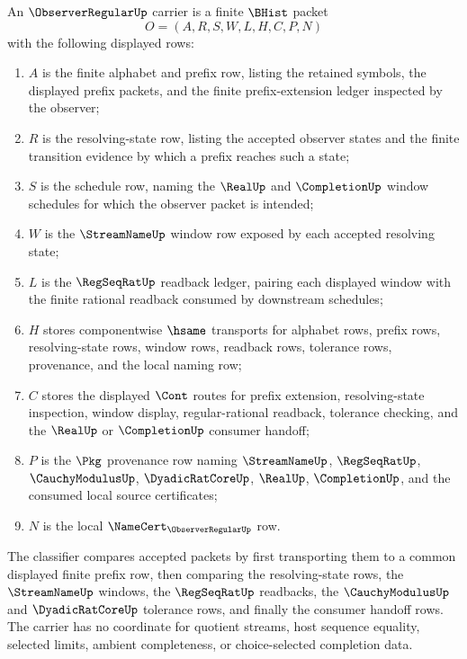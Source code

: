\begin{definition}
\label{def:observerregular-prefix-carrier}
An $\ObserverRegularUp$ carrier is a finite $\BHist$ packet
$$
O=(A,R,S,W,L,H,C,P,N)
$$
with the following displayed rows:
\begin{enumerate}
\item $A$ is the finite alphabet and prefix row, listing the retained symbols, the displayed prefix packets, and the finite prefix-extension ledger inspected by the observer;
\item $R$ is the resolving-state row, listing the accepted observer states and the finite transition evidence by which a prefix reaches such a state;
\item $S$ is the schedule row, naming the $\RealUp$ and $\CompletionUp$ window schedules for which the observer packet is intended;
\item $W$ is the $\StreamNameUp$ window row exposed by each accepted resolving state;
\item $L$ is the $\RegSeqRatUp$ readback ledger, pairing each displayed window with the finite rational readback consumed by downstream schedules;
\item $H$ stores componentwise $\hsame$ transports for alphabet rows, prefix rows, resolving-state rows, window rows, readback rows, tolerance rows, provenance, and the local naming row;
\item $C$ stores the displayed $\Cont$ routes for prefix extension, resolving-state inspection, window display, regular-rational readback, tolerance checking, and the $\RealUp$ or $\CompletionUp$ consumer handoff;
\item $P$ is the $\Pkg$ provenance row naming $\StreamNameUp$, $\RegSeqRatUp$, $\CauchyModulusUp$, $\DyadicRatCoreUp$, $\RealUp$, $\CompletionUp$, and the consumed local source certificates;
\item $N$ is the local $\NameCert_{\ObserverRegularUp}$ row.
\end{enumerate}
The classifier compares accepted packets by first transporting them to a common displayed finite prefix row, then comparing the resolving-state rows, the $\StreamNameUp$ windows, the $\RegSeqRatUp$ readbacks, the $\CauchyModulusUp$ and $\DyadicRatCoreUp$ tolerance rows, and finally the consumer handoff rows. The carrier has no coordinate for quotient streams, host sequence equality, selected limits, ambient completeness, or choice-selected completion data.
\end{definition}

